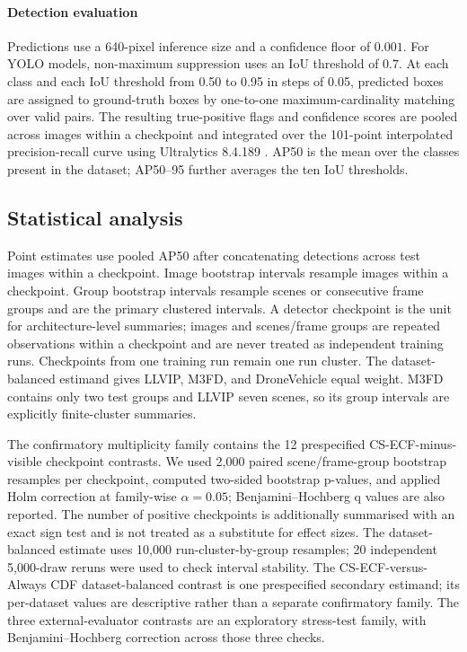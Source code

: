 \documentclass[preprint,11pt]{elsarticle}
\begin{document}
\paragraph{Detection evaluation}
Predictions use a 640-pixel inference size and a confidence floor of
\(0.001\). For YOLO models, non-maximum suppression uses an IoU threshold of
\(0.7\). At each class and each IoU threshold from 0.50 to 0.95 in steps of
0.05, predicted boxes are assigned to ground-truth boxes by one-to-one
maximum-cardinality matching over valid pairs. The resulting true-positive
flags and confidence scores are pooled across images within a checkpoint and
integrated over the 101-point interpolated precision-recall curve using
Ultralytics 8.4.189 \cite{jocher2026ultralytics}. AP50 is the mean over the
classes present in the dataset; AP50--95 further averages the ten IoU
thresholds.

\subsection{Statistical analysis}

Point estimates use pooled AP50 after concatenating detections across test
images within a checkpoint. Image bootstrap intervals resample images within a
checkpoint. Group bootstrap intervals resample scenes or consecutive frame
groups and are the primary clustered intervals. A detector checkpoint is the
unit for architecture-level summaries; images and scenes/frame groups are
repeated observations within a checkpoint and are never treated as independent
training runs. Checkpoints from one training run remain one run cluster.
The dataset-balanced estimand gives LLVIP, M3FD, and DroneVehicle equal weight.
M3FD contains only two test groups and LLVIP seven scenes, so its group
intervals are explicitly finite-cluster summaries.

The confirmatory multiplicity family contains the 12 prespecified
CS-ECF-minus-visible checkpoint contrasts. We used 2,000 paired
scene/frame-group bootstrap resamples per checkpoint, computed two-sided
bootstrap p-values, and applied Holm correction at family-wise
\(\alpha=0.05\); Benjamini--Hochberg q values are also reported. The number of
positive checkpoints is additionally summarised with an exact sign test and is
not treated as a substitute for effect sizes. The dataset-balanced estimate
uses 10,000 run-cluster-by-group resamples; 20 independent 5,000-draw reruns
were used to check interval stability. The CS-ECF-versus-Always CDF
dataset-balanced contrast is one prespecified secondary estimand; its
per-dataset values are descriptive rather than a separate confirmatory family.
The three external-evaluator contrasts are an exploratory stress-test family,
with Benjamini--Hochberg correction across those three checks.
\end{document}
